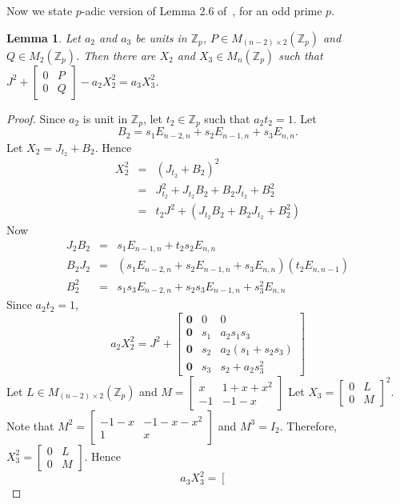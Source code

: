 \documentclass[12pt,a4paper]{article}
\newtheorem{lem}{Lemma}[section]
\begin{document}
	Now we state $p$-adic version of Lemma 2.6 of~\cite{Koo2025}, for an odd prime $p$.
	\begin{lem} \label{Lemma 2.6 for odd prime}
		Let $a_2$ and $a_3$ be units in $\mathbb{Z}_p$, $P \in M_{(n-2) \times 2}(\mathbb{Z}_p)$ and $Q \in M_2(\mathbb{Z}_p)$. Then there are $X_2$ and $X_3 \in M_n(\mathbb{Z}_p)$ such that $J^2 + \begin{bmatrix}
			0 & P\\
			0 & Q
		\end{bmatrix} - a_2X_2^2 = a_3 X_3^2 $. 
	\end{lem}
	\begin{proof}
		Since $a_2$ is unit in $\mathbb{Z}_p$, let $t_2 \in \mathbb{Z}_p$ such that $a_2t_2=1$. Let
		\begin{equation*}
			B_2 = s_1 E_{n-2,n} + s_2 E_{n-1,n} +s_3 E_{n,n}.
		\end{equation*}
		Let	$X_2 = J_{t_2} + B_2$. Hence
		\begin{eqnarray*}
		    X_2^2 &=& (J_{t_2} + B_2)^2 \\
			&=& J^2_{t_2} + J_{t_2} B_2 + B_2J_{t_2} +B_2^2 \\
			&=& t_2 J^2 + (J_{t_2} B_2 + B_2J_{t_2} +B_2^2)
		\end{eqnarray*}
		Now \begin{eqnarray*}
			J_2B_2 &=& s_1 E_{n-1,n} + t_2s_2 E_{n,n} \\
			B_2J_2 &=& (s_1 E_{n-2,n} + s_2E_{n-1,n} +s_3 E_{n,n}) (t_2 E_{n,n-1}) \\
			B_2^2 &=& s_1s_3 E_{n-2,n} + s_2s_3 E_{n-1,n} + s_3^2 E_{n,n}
		\end{eqnarray*}
		Since $a_2t_2=1$,
		\begin{equation} \label{Eq a2X2^2 for odd prime}
			a_2X_2^2 = J^2 +  \left[
			\begin{array}{c|cc}
				\textbf{0} & 0 & 0 \\ 
				\textbf{0} & s_1 & a_2s_1s_3 \\\hline
				\textbf{0} & s_2 & a_2 (s_1+s_2s_3) \\
				\textbf{0} & s_3 & s_2+ a_2s_3^2
			\end{array}
			\right]
		\end{equation}
		Let $L \in M_{(n-2) \times 2} (\mathbb{Z}_p)$ and $M = \begin{bmatrix}
			x & 1+x+x^2 \\
			-1 & -1-x
		\end{bmatrix}$
		Let $X_3 = \begin{bmatrix}
			0 & L \\
			0 & M
		\end{bmatrix}^2$. Note that $M^2 = \begin{bmatrix}
		-1-x & -1-x-x^2 \\
		1 & x
		\end{bmatrix}$ and $M^3 = I_2$. Therefore, $X_3 ^2 = \begin{bmatrix}
		0 & L \\
		0 & M
		\end{bmatrix}$. Hence
		\begin{equation} \label{Eq a3X3^2 for odd prime}
			a_3X_3^2 = \left[
			\begin{array}{c|cc}
				

\end{array}
\end{equation}
\end{proof}
\end{document}
